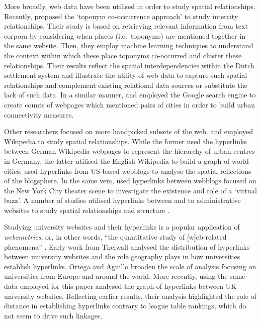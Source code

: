 \documentclass[]{interact}
\theoremstyle{plain}%
\theoremstyle{definition}
\theoremstyle{remark}
\begin{document}
More broadly, web data have been utilised in order to study spatial
relationships. Recently, \citet{meijers2019using} proposed the `toponym
co-occurrence approach' to study intercity relationships. Their study is
based on retrieving relevant information from text corpora by
considering when places (i.e.~toponyms) are mentioned together in the
same website. Then, they employ machine learning techniques to
understand the context within which these place toponyms co-occurred and
cluster these relationships. Their results reflect the spatial
interdependencies within the Dutch settlement system and illustrate the
utility of web data to capture such spatial relationships and complement
existing relational data sources or substitute the lack of such data. In
a similar manner, \citet{devriendt2008cyberplace} and
\citet{janc2015visibility} employed the Google search engine to create
counts of webpages which mentioned pairs of cities in order to build
urban connectivity measures.

Other researchers focused on more handpicked subsets of the web.
\citet{kessler2017extracting} and \citet{salvini2016spatialization}
employed Wikipedia to study spatial relationships. While the former used
the hyperlinks between German Wikipedia webpages to represent the
hierarchy of urban centres in Germany, the latter utilised the English
Wikipedia to build a graph of world cities. \citet{lin2007blog} used
hyperlinks from US-based webblogs to analyse the spatial reflections of
the blogsphere. In the same vein, \citet{jones2010blog} used hyperlinks
between webblogs focused on the New York City theater scene to
investigate the existence and role of a `virtual buzz'. A number of
studies utilised hyperlinks between and to administrative websites to
study spatial relationships and structure
\citep{holmberg2009local, holmberg2010co, janc2015geography}.

Studying university websites and their hyperlinks is a popular
application of \emph{webometrics}, or, in other words, ``the
quantitative study of {[}w{]}eb-related phenomena''
\citet{thelwall_webometrics}. Early work from Thelwall
\citep{thelwall2002top, thelwall2002evidence} analysed the distribution
of hyperlinks between university websites and the role geography plays
in how universities establish hyperlinks. Ortega and Aguillo
\citetext{\citeyear{ortega2008linking}; \citeyear{ortega2008visualization}; \citeyear{ortega2009mapping}}
broaden the scale of analysis focusing on universities from Europe and
around the world. More recently, \citet{hale2014mapping} using the same
data employed for this paper analysed the graph of hyperlinks between UK
university websites. Reflecting earlier results, their analysis
highlighted the role of distance in establishing hyperlinks contrary to
league table rankings, which do not seem to drive such linkages.
\end{document}
